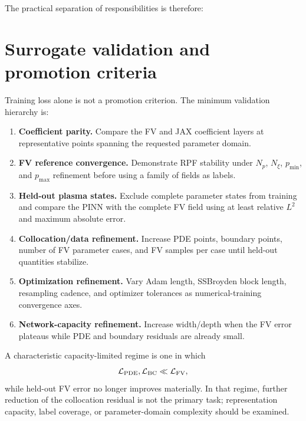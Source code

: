 \documentclass[11pt]{article}
\begin{document}
The practical separation of responsibilities is therefore:
\begin{center}
\end{center}

\section{Surrogate validation and promotion criteria}
\label{sec:surrogate_qualification}

Training loss alone is not a promotion criterion.  The minimum validation hierarchy is:
\begin{enumerate}[leftmargin=2.3em]
 \item \textbf{Coefficient parity.}  Compare the FV and JAX coefficient layers at
       representative points spanning the requested parameter domain.
 \item \textbf{FV reference convergence.}  Demonstrate RPF stability under $N_p$, $N_\xi$,
       $p_{\min}$, and $p_{\max}$ refinement before using a family of fields as labels.
 \item \textbf{Held-out plasma states.}  Exclude complete parameter states from training
       and compare the PINN with the complete FV field using at least relative $L^2$ and
       maximum absolute error.
 \item \textbf{Collocation/data refinement.}  Increase PDE points, boundary points, number
       of FV parameter cases, and FV samples per case until held-out quantities stabilize.
 \item \textbf{Optimization refinement.}  Vary Adam length, SSBroyden block length,
       resampling cadence, and optimizer tolerances as numerical-training convergence axes.
 \item \textbf{Network-capacity refinement.}  Increase width/depth when the FV error
       plateaus while PDE and boundary residuals are already small.
\end{enumerate}

A characteristic capacity-limited regime is one in which
\begin{equation}
 \mathcal L_{\rm PDE},\mathcal L_{\rm BC}\ll\mathcal L_{\rm FV},
\end{equation}
while held-out FV error no longer improves materially.  In that regime, further reduction
of the collocation residual is not the primary task; representation capacity, label
coverage, or parameter-domain complexity should be examined.
\end{document}
